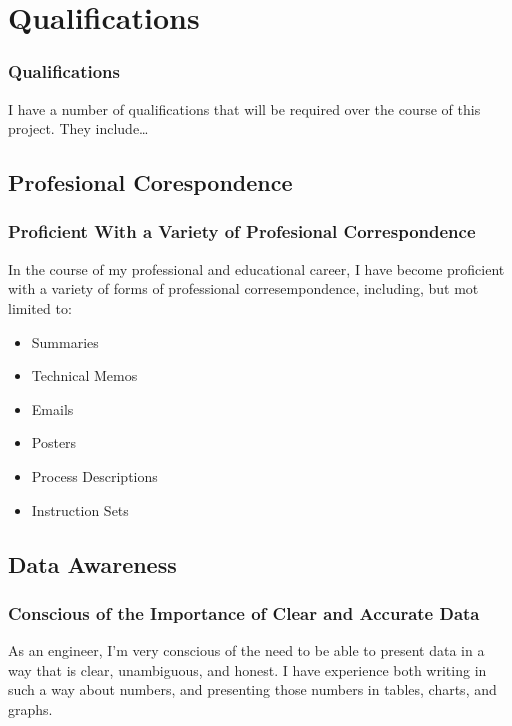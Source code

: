 \documentclass{beamer}
\begin{document}
\section{Qualifications}
\begin{frame}
  \frametitle{Qualifications}
  I have a number of qualifications that will be required over the course of
  this project. They include\ldots
\end{frame}

\subsection{Profesional Corespondence}
\begin{frame}
  \frametitle{Proficient With a Variety of Profesional Correspondence}
  In the course of my professional and educational career, I have become
  proficient with a variety of forms of professional corresempondence,
  including, but mot limited to:
  \begin{itemize}
    \item Summaries
    \item Technical Memos
    \item Emails
    \item Posters
    \item Process Descriptions
    \item Instruction Sets
  \end{itemize}
\end{frame}

\subsection{Data Awareness}
\begin{frame}
  \frametitle{Conscious of the Importance of Clear and Accurate Data}
  As an engineer, I'm very conscious of the need to be able to present data in
  a way that is clear, unambiguous, and honest.  I have experience both
  writing in such a way about numbers, and presenting those numbers in tables,
  charts, and graphs.
\end{frame}
\end{document}
